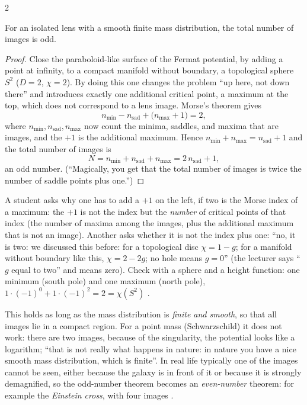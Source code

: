 \begin{paracol}{2}
\begin{proposition}\label{prop:c17-odd}
For an isolated lens with a smooth finite mass distribution, the total number of images is odd.
\end{proposition}
\begin{proof}
Close the paraboloid-like surface of the Fermat potential, by adding a point at infinity, to a compact manifold without boundary, a topological sphere $S^2$ ($D=2$, $\chi=2$). By doing this one changes the problem ``up here, not down there'' and introduces exactly one additional critical point, a maximum at the top, which does not correspond to a lens image. Morse's theorem gives
\[
  n_{\min}-n_{\mathrm{sad}}+\bigl(n_{\max}+1\bigr)=2,
\]
where $n_{\min},n_{\mathrm{sad}},n_{\max}$ now count the minima, saddles, and maxima that are images, and the $+1$ is the additional maximum. Hence $n_{\min}+n_{\max}=n_{\mathrm{sad}}+1$ and the total number of images is
\[
  N=n_{\min}+n_{\mathrm{sad}}+n_{\max}=2\,n_{\mathrm{sad}}+1,
\]
an odd number. (``Magically, you get that the total number of images is twice the number of saddle points plus one.'') 
\end{proof}
\begin{coursenote}
A student asks why one has to add a $+1$ on the left, if two is the Morse index of a maximum: the $+1$ is not the index but the \emph{number} of critical points of that index (the number of maxima among the images, plus the additional maximum that is not an image). Another asks whether it is not the index plus one: ``no, it is two: we discussed this before: for a topological disc $\chi=1-g$; for a manifold without boundary like this, $\chi=2-2g$; no hole means $g=0$'' (the lecturer says ``$g$ equal to two'' and means zero). Check with a sphere and a height function: one minimum (south pole) and one maximum (north pole), $1\cdot(-1)^0+1\cdot(-1)^2=2=\chi(S^2)$ .
\end{coursenote}
This holds as long as the mass distribution is \emph{finite and smooth}, so that all images lie in a compact region. For a point mass (Schwarzschild) it does not work: there are two images, because of the singularity, the potential looks like a logarithm; ``that is not really what happens in nature: in nature you have a nice smooth mass distribution, which is finite''. In real life typically one of the images cannot be seen, either because the galaxy is in front of it or because it is strongly demagnified, so the odd-number theorem becomes an \emph{even-number} theorem: for example the \emph{Einstein cross}, with four images .

\end{paracol}
